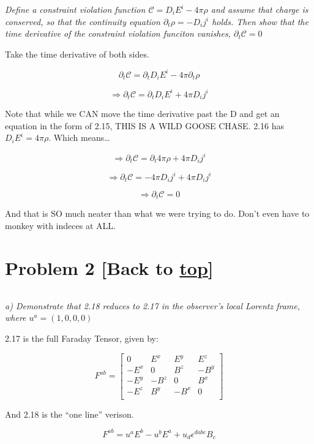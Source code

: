 \documentclass[landscape,letterpaper,10pt,english]{article}
\begin{document}
\[\label{P1}\]

\emph{Define a constraint violation function
\(\mathcal{C} = D_iE^i - 4\pi\rho\) and assume that charge is conserved,
so that the continuity equation \(\partial_t \rho = -D_ij^i\) holds.
Then show that the time derivative of the constraint violation funciton
vanishes, \(\partial_t \mathcal{C} = 0\)}

    Take the time derivative of both sides.

\[ \partial_t \mathcal C = \partial_t D_i E^i - 4\pi \partial_t \rho \]

\[ \Rightarrow \partial_t \mathcal C = \partial_t D_i E^i + 4\pi D_i j^i \]

    Note that while we CAN move the time derivative past the D and get an
equation in the form of 2.15, THIS IS A WILD GOOSE CHASE. 2.16 has
\(D_i E^i = 4\pi \rho\). Which means\ldots{}

\[ \Rightarrow \partial_t \mathcal C = \partial_t 4\pi \rho + 4\pi D_i j^i \]

\[ \Rightarrow \partial_t \mathcal C = - 4\pi D_i j^i + 4\pi D_i j^i \]

\[ \Rightarrow \partial_t \mathcal C = 0 \]

And that is SO much neater than what we were trying to do. Don't even
have to monkey with indeces at ALL.

    \hypertarget{problem-2-back-to-top}{%
\section{\texorpdfstring{Problem 2 {[}Back to
\hyperref[toc]{top}{]}}{Problem 2 {[}Back to {]}}}\label{problem-2-back-to-top}}

\[\label{P2}\]

\emph{a) Demonstrate that 2.18 reduces to 2.17 in the observer's local
Lorentz frame, where \(u^a = (1,0,0,0)\)}

    2.17 is the full Faraday Tensor, given by:

\[ F^{ab} = \begin{bmatrix}
0 & E^x & E^y & E^z \\
-E^x & 0 & B^z & -B^y \\
-E^y & -B^z & 0 & B^x \\
-E^z & B^y & -B^x & 0 \\
\end{bmatrix}
\]

And 2.18 is the ``one line'' verison.

\[ F^{ab} = u^aE^b - u^bE^a + u_d\epsilon^{dabc} B_c \]
\end{document}
